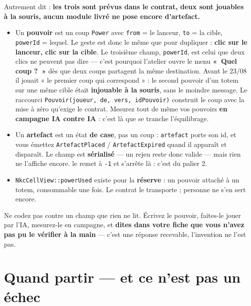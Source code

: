 Autrement dit : \textbf{les trois sont prévus dans le contrat, deux sont jouables
à la souris, aucun module livré ne pose encore d'artefact.}

\begin{itemize}
  \item Un \textbf{pouvoir} est un coup \texttt{Power} avec \texttt{from} = le
        lanceur, \texttt{to} = la cible, \texttt{powerId} = lequel. Le geste est
        donc le même que pour dupliquer : \textbf{clic sur le lanceur, clic sur
        la cible}. Le troisième champ, \texttt{powerId}, est celui que deux clics
        ne peuvent pas dire --- c'est pourquoi l'atelier ouvre le menu
        \textbf{«~Quel coup ?~»} dès que deux coups partagent la même
        destination. Avant le 23/08 il jouait « le premier coup qui correspond » :
        le second pouvoir d'un totem sur une même cible était
        \textbf{injouable à la souris}, sans le moindre message. Le raccourci
        \texttt{Pouvoir(joueur, de, vers, idPouvoir)} construit le coup avec la
        mise à zéro qu'exige le contrat. Mesurez tout de même vos pouvoirs
        \textbf{en campagne IA contre IA} : c'est là que se tranche
        l'équilibrage.
  \item Un \textbf{artefact} est un état \textbf{de case}, pas un coup :
        \texttt{artefact} porte son id, et vous émettez
        \texttt{ArtefactPlaced} / \texttt{ArtefactExpired} quand il apparaît et
        disparaît. Le champ est \textbf{sérialisé} --- un rejeu reste donc
        valide --- mais rien ne l'affiche encore.
         le remet à \texttt{-1} et s'arrête là :
        c'est du palier 2.
  \item \texttt{NkcCellView::powerUsed} existe pour la \textbf{réserve} : un
        pouvoir attaché à un totem, consommable une fois. Le contrat le
        transporte ; personne ne s'en sert encore.
\end{itemize}

\begin{nkretenir}
Ne codez pas contre un champ que rien ne lit. Écrivez le pouvoir, faites-le jouer
par l'IA, mesurez-le en campagne, et \textbf{dites dans votre fiche que vous
n'avez pas pu le vérifier à la main} --- c'est une réponse recevable, l'invention
ne l'est pas.
\end{nkretenir}

\section{Quand partir --- et ce n'est pas un échec}

